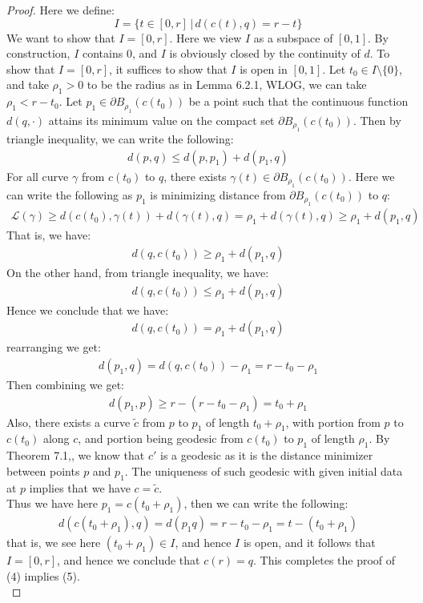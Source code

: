\documentclass[11pt]{book}
\theoremstyle{break}
\theoremstyle{break}
\newcommand{\pd}{\partial}
\newcommand{\that}[1]{\widetilde{#1}}
\begin{document}
\begin{proof}
Here we define: 
$$I = \{t \in [0,r]\,|\, d(c(t),q) = r-t\}$$ 
We want to show that $I= [0,r]$. Here we view $I$ as a subspace of $[0,1]$. By construction, $I$ contains $0$, and $I$ is obviously closed by the continuity of $d$. To show that $I = [0,r]$, it suffices to show that $I$ is open in $[0,1]$. Let $t_0 \in I\setminus \{0\}$, and take $\rho_1>0$ to be the radius as in Lemma 6.2.1, WLOG, we can take $\rho_1<r-t_0$.  Let $p_1 \in \pd B_{\rho_1}(c(t_0))$ be a point such that the continuous function $d(q,\cdot)$ attains its minimum value on the compact set $\pd B_{\rho_1}(c(t_0))$. Then by triangle inequality, we can write the following:
\begin{align*}
d(p,q) \leq d(p,p_1) + d(p_1,q)
\end{align*}
For all curve $\gamma$ from $c(t_0)$ to $q$, there exists $\gamma(t) \in \pd B_{\rho_1}(c(t_0))$. Here we can write the following as $p_1$ is minimizing distance from $\pd B_{\rho_1}(c(t_0))$ to $q$:
\begin{align*}
\mathcal{L}(\gamma) \geq d(c(t_0), \gamma(t)) + d(\gamma(t),q) = \rho_1 + d(\gamma(t),q)\geq \rho_1 +d(p_1,q)
\end{align*}
That is, we have:
\begin{align*}
 d(q,c(t_0)) \geq \rho_1  + d(p_1,q)
\end{align*}
On the other hand, from triangle inequality, we have:
\begin{align*}
 d(q,c(t_0)) \leq \rho_1+ d(p_1,q)
\end{align*}
Hence we conclude that we have:
\begin{align*}
d(q,c(t_0)) = \rho_1 +d(p_1,q)
\end{align*}
rearranging we get:
\begin{align*}
d(p_1,q) = d(q,c(t_0)) - \rho_1 = r-t_0 - \rho_1
\end{align*}
Then combining we get:
\begin{align*}
d(p_1,p) \geq r- (r-t_0 -\rho_1) = t_0 + \rho_1
\end{align*}
Also, there exists a curve $\that{c}$ from $p$ to $p_1$ of length $t_0 + \rho_1$, with portion from $p$ to $c(t_0)$ along $c$, and portion being geodesic from $c(t_0)$ to $p_1$ of length $\rho_1$. By Theorem 7.1,, we know that $c'$ is a geodesic as it is the distance minimizer between points $p$ and $p_1$. The uniqueness of such geodesic with given initial data at $p$ implies that we have $c = \that{c}$. \\

Thus we have here $p_1  = c(t_0 +\rho_1)$, then we can write the following:
\begin{align*}
d(c(t_0+\rho_1), q) = d(p_1 q) = r-t_0 - \rho_1 = t-(t_0 +\rho_1)
\end{align*} 
that is, we see here $(t_0+\rho_1) \in I$, and hence $I$ is open, and it follows that $I = [0,r]$, and hence we conclude that $c(r) = q$. This completes the proof of (4) implies (5). \\


\end{proof}
\end{document}
